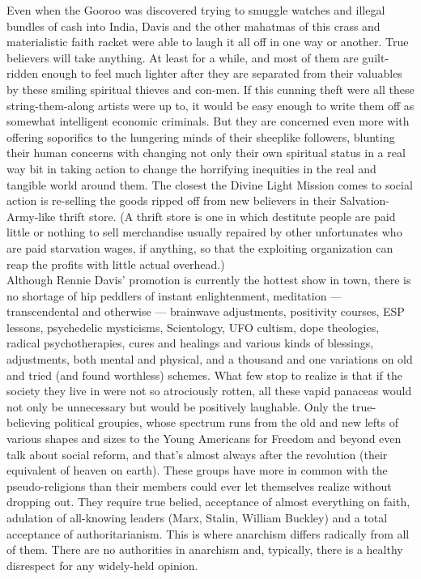 Even when the Gooroo was discovered trying to smuggle watches and illegal bundles of cash into India, Davis and the other mahatmas of this crass and materialistic faith racket were able to laugh it all off in one way or another. True believers will take anything. At least for a while, and most of them are guilt-ridden enough to feel much lighter after they are separated from their valuables by these smiling spiritual thieves and con-men. If this cunning theft were all these string-them-along artists were up to, it would be easy enough to write them off as somewhat intelligent economic criminals. But they are concerned even more with offering soporifics to the hungering minds of their sheeplike followers, blunting their human concerns with changing not only their own spiritual status in a real way bit in taking action to change the horrifying inequities in the real and tangible world around them. The closest the Divine Light Mission comes to social action is re-selling the goods ripped off from new believers in their Salvation-Army-like thrift store. (A thrift store is one in which destitute people are paid little or nothing to sell merchandise usually repaired by other unfortunates who are paid starvation wages, if anything, so that the exploiting organization can reap the profits with little actual overhead.)\\
Although Rennie Davis' promotion is currently the hottest show in town, there is no shortage of hip peddlers of instant enlightenment, meditation --- transcendental and otherwise --- brainwave adjustments, positivity courses, ESP lessons, psychedelic mysticisms, Scientology, UFO cultism, dope theologies, radical psychotherapies, cures and healings and various kinds of blessings, adjustments, both mental and physical, and a thousand and one variations on old and tried (and found worthless) schemes. What few stop to realize is that if the society they live in were not so atrociously rotten, all these vapid panaceas would not only be unnecessary but would be positively laughable. Only the true-believing political groupies, whose spectrum runs from the old and new lefts of various shapes and sizes to the Young Americans for Freedom and beyond even talk about social reform, and that's almost always after the revolution (their equivalent of heaven on earth). These groups have more in common with the pseudo-religions than their members could ever let themselves realize without dropping out. They require true belied, acceptance of almost everything on faith, adulation of all-knowing leaders (Marx, Stalin, William Buckley) and a total acceptance of authoritarianism. This is where anarchism differs radically from all of them. There are no authorities in anarchism and, typically, there is a healthy disrespect for any widely-held opinion.\\
